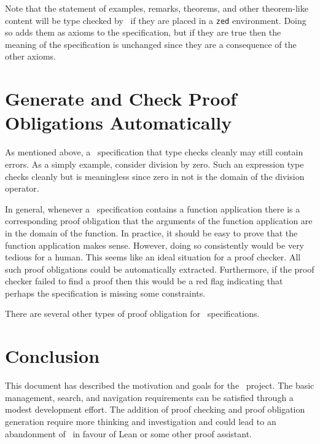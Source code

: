 \documentclass{amsart}
\begin{document}
 Note that the statement of examples, remarks, theorems, and other theorem-like content will be type checked by \fuzz\ if
 they are placed in a \texttt{zed} environment. 
 Doing so adds them as axioms to the specification, but if they are true then the meaning of the specification is unchanged
 since they are a consequence of the other axioms.
 
 \hypertarget{generate-and-check-proof-obligations-automatically}{}
 \section{Generate and Check Proof Obligations Automatically}
 
 As mentioned above, a \ZN\ specification that type checks cleanly may still contain errors.
 As a simply example, consider division by zero. 
 Such an expression type checks cleanly but is meaningless since zero in not is the domain of the division operator.
 
 In general, whenever a \ZN\ specification contains a function application there is a corresponding proof obligation
 that the arguments of the function application are in the domain of the function.
 In practice, it should be easy to prove that the function application makes sense.
 However, doing so consistently would be very tedious for a human.
 This seems like an ideal situation for a proof checker.
 All such proof obligations could be automatically extracted.
 Furthermore, if the proof checker failed to find a proof then this would be a red flag indicating that perhaps the specification
 is missing some constraints.
 
 There are several other types of proof obligation for \ZN\ specifications.
 
 \section{Conclusion}
 
 This document has described the motivation and goals for the \mathz\ project.
 The basic management, search, and navigation requirements can be satisfied through a modest development effort.
 The addition of proof checking and proof obligation generation require more thinking and investigation and could
 lead to an abandonment of \ZN\ in favour of Lean or some other proof assistant.
\end{document}
